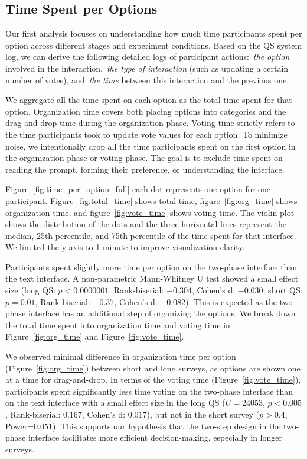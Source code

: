 \subsection{Time Spent per Options}
\label{sec:time_per_option}
Our first analysis focuses on understanding how much time participants spent per option across different stages and experiment conditions. Based on the QS system log, we can derive the following detailed logs of participant actions:~\textit{the option}  involved in the interaction,~\textit{the type of interaction} (such as updating a certain number of votes), and~\textit{the time} between this interaction and the previous one.

We aggregate all the time spent on each option as the total time spent for that option. Organization time covers both placing options into categories and the drag-and-drop time during the organization phase. Voting time strictly refers to the time participants took to update vote values for each option. To minimize noise, we intentionally drop all the time participants spent on the first option in the organization phase or voting phase. The goal is to exclude time spent on reading the prompt, forming their preference, or understanding the interface.

Figure~\ref{fig:time_per_option_full} each dot represents one option for one participant. Figure~\ref{fig:total_time} shows total time, figure~\ref{fig:org_time} shows organization time, and figure~\ref{fig:vote_time} shows voting time. The violin plot shows the distribution of the dots and the three horizontal lines represent the median, 25th percentile, and 75th percentile of the time spent for that interface. We limited the y-axis to 1 minute to improve visualization clarity.

Participants spent slightly more time per option on the two-phase interface than the text interface. A non-parametric Mann-Whitney U test showed a small effect size (long QS: $p<0.0000001$, Rank-biserial: $-0.304$, Cohen's d: $-0.030$; short QS: $p=0.01$, Rank-biserial: $-0.37$, Cohen's d: $-0.082$). This is expected as the two-phase interface has an additional step of organizing the options. We break down the total time spent into organization time and voting time in Figure~\ref{fig:org_time} and Figure~\ref{fig:vote_time}.

We observed minimal difference in organization time per option (Figure~\ref{fig:org_time}) between short and long surveys, as options are shown one at a time for drag-and-drop. In terms of the voting time (Figure~\ref{fig:vote_time}), participants spent significantly less time voting on the two-phase interface than on the text interface with a small effect size in the long QS ($U=24053$, $p<0.005$, Rank-biserial: $0.167$, Cohen's d: $0.017$), but not in the short survey ($p>0.4$, Power=$0.051$). This supports our hypothesis that the two-step design in the two-phase interface facilitates more efficient decision-making, especially in longer surveys.

